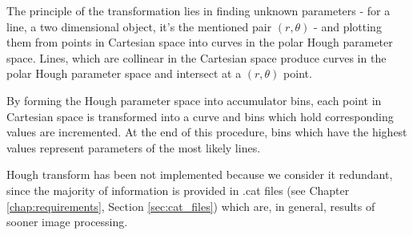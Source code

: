 	The principle of the transformation lies in finding unknown parameters - for a line, a two dimensional object, it's the mentioned pair $(r,\theta)$ - and plotting them from points in Cartesian space into curves in the polar Hough parameter space. Lines, which are collinear in the Cartesian space produce curves in the polar Hough parameter space and intersect at a $(r,\theta)$ point. 
	
	By forming the Hough parameter space into accumulator bins, each point in Cartesian space is transformed into a curve and bins which hold corresponding values are incremented. At the end of this procedure, bins which have the highest values represent parameters of the most likely lines.
	
	Hough transform has been not implemented because we consider it redundant, since the majority of information is provided in .cat files (see Chapter \ref{chap:requirements}, Section \ref{sec:cat_files}) which are, in general, results of sooner image processing.